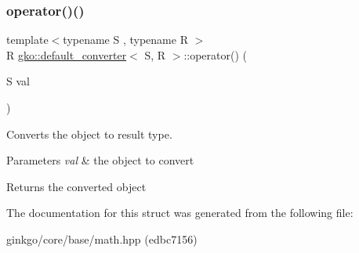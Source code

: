 \subsubsection{\texorpdfstring{operator()()}{operator()()}}
{\footnotesize\ttfamily template$<$typename S , typename R $>$ \\
R \hyperlink{structgko_1_1default__converter}{gko\+::default\+\_\+converter}$<$ S, R $>$\+::operator() (\begin{DoxyParamCaption}\item[{S}]{val }\end{DoxyParamCaption})\hspace{0.3cm}{\ttfamily [inline]}}



Converts the object to result type. 


\begin{DoxyParams}{Parameters}
{\em val} & the object to convert \\
\hline
\end{DoxyParams}
\begin{DoxyReturn}{Returns}
the converted object 
\end{DoxyReturn}


The documentation for this struct was generated from the following file\+:\begin{DoxyCompactItemize}
\item 
ginkgo/core/base/math.\+hpp (edbc7156)\end{DoxyCompactItemize}

